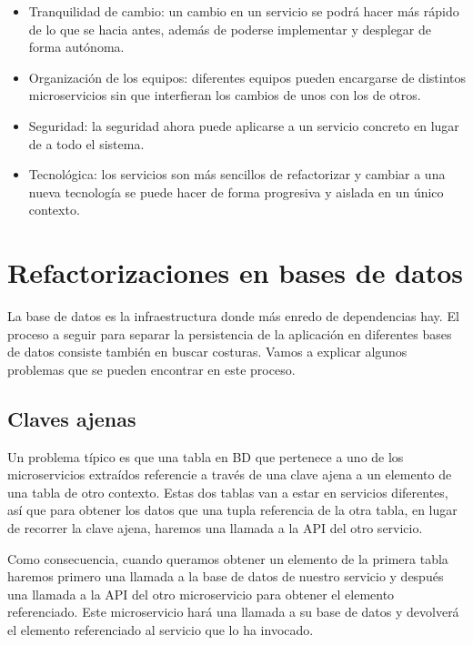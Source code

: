 \documentclass[11pt,a4paper]{article}
\begin{document}
\begin{itemize}

\item Tranquilidad de cambio: un cambio en un servicio se podrá hacer más rápido de lo que se hacia antes, además de poderse implementar y desplegar de forma autónoma.

\item Organización de los equipos: diferentes equipos pueden encargarse de distintos microservicios sin que interfieran los cambios de unos con los de otros.

\item Seguridad: la seguridad ahora puede aplicarse a un servicio concreto en lugar de a todo el sistema.

\item Tecnológica: los servicios son más sencillos de refactorizar y cambiar a una nueva tecnología se puede hacer de forma progresiva y aislada en un único contexto.

\end{itemize}


\section{Refactorizaciones en bases de datos}

La base de datos es la infraestructura donde más enredo de dependencias hay. El proceso a seguir para separar la persistencia de la aplicación en diferentes bases de datos consiste también en buscar costuras. Vamos a explicar algunos problemas que se pueden encontrar en este proceso.

\subsection{Claves ajenas}

Un problema típico es que una tabla en BD que pertenece a uno de los microservicios extraídos referencie a través de una clave ajena a un elemento de una tabla de otro contexto. Estas dos tablas van a estar en servicios diferentes, así que para obtener los datos que una tupla referencia de la otra tabla, en lugar de recorrer la clave ajena, haremos una llamada a la API del otro servicio. 

Como consecuencia, cuando queramos obtener un elemento de la primera tabla haremos primero una llamada a la base de datos de nuestro servicio y después una llamada a la API del otro microservicio para obtener el elemento referenciado. Este microservicio hará una llamada a su base de datos y devolverá el elemento referenciado al servicio que lo ha invocado.
\end{document}

